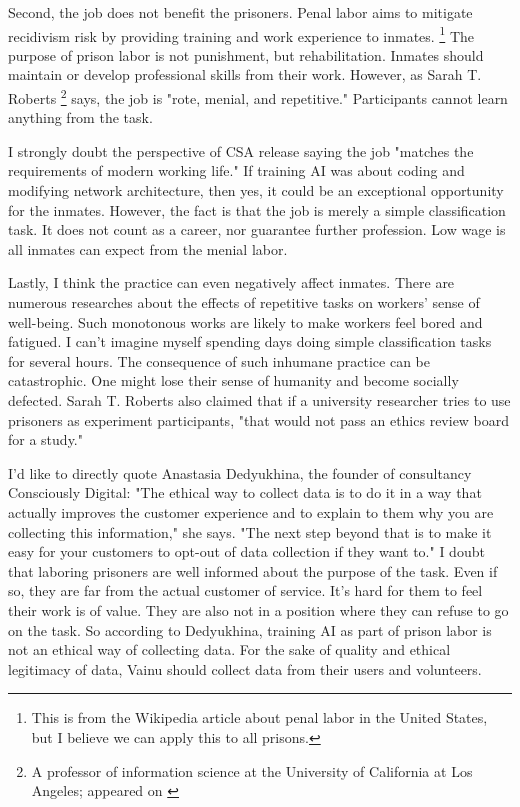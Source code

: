 \documentclass[10pt,a4paper]{article}
\begin{document}
	Second, the job does not benefit the prisoners. Penal labor aims to mitigate recidivism risk by providing training and work experience to inmates.\cite{wiki} \footnote{This is from the Wikipedia article about penal labor in the United States, but I believe we can apply this to all prisons.} The purpose of prison labor is not punishment, but rehabilitation. Inmates should maintain or develop professional skills from their work. However, as Sarah T. Roberts \footnote{A professor of information science at the University of California at Los Angeles; appeared on \cite{givenarticle}} says, the job is "rote, menial, and repetitive." Participants cannot learn anything from the task.
	
	I strongly doubt the perspective of CSA release saying the job "matches the requirements of modern working life."\cite{csa} If training AI was about coding and modifying network architecture, then yes, it could be an exceptional opportunity for the inmates. However, the fact is that the job is merely a simple classification task. It does not count as a career, nor guarantee further profession. Low wage is all inmates can expect from the menial labor. 
	
	Lastly, I think the practice can even negatively affect inmates. There are numerous researches about the effects of repetitive tasks on workers' sense of well-being. Such monotonous works are likely to make workers feel bored and fatigued. I can't imagine myself spending days doing simple classification tasks for several hours. The consequence of such inhumane practice can be catastrophic.  One might lose their sense of humanity and become socially defected. Sarah T. Roberts also claimed that if a university researcher tries to use prisoners as experiment participants, "that would not pass an ethics review board for a study."
	
	I'd like to directly quote Anastasia Dedyukhina, the founder of consultancy Consciously Digital: "The ethical way to collect data is to do it in a way that actually improves the customer experience and to explain to them why you are collecting this information," she says. "The next step beyond that is to make it easy for your customers to opt-out of data collection if they want to."\cite{zdnet} I doubt that laboring prisoners are well informed about the purpose of the task. Even if so, they are far from the actual customer of service. It's hard for them to feel their work is of value. They are also not in a position where they can refuse to go on the task. So according to Dedyukhina, training AI as part of prison labor is not an ethical way of collecting data. For the sake of quality and ethical legitimacy of data, Vainu should collect data from their users and volunteers.
	
\end{document}
